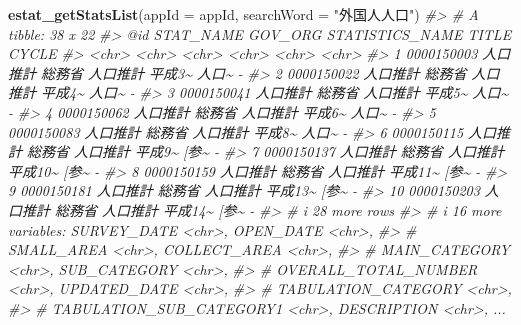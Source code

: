 \documentclass[
  xelatex, ja=standard]{bxjsbook}
\newenvironment{Shaded}{\begin{snugshade}}{\end{snugshade}}
\newcommand{\AttributeTok}[1]{\textcolor[rgb]{0.13,0.29,0.53}{#1}}
\newcommand{\CommentTok}[1]{\textcolor[rgb]{0.56,0.35,0.01}{\textit{#1}}}
\newcommand{\FunctionTok}[1]{\textcolor[rgb]{0.13,0.29,0.53}{\textbf{#1}}}
\newcommand{\NormalTok}[1]{#1}
\newcommand{\StringTok}[1]{\textcolor[rgb]{0.31,0.60,0.02}{#1}}
\theoremstyle{definition}
\theoremstyle{definition}
\theoremstyle{definition}
\theoremstyle{definition}
\theoremstyle{remark}
\begin{document}
\begin{Shaded}
\begin{Highlighting}[]
\FunctionTok{estat\_getStatsList}\NormalTok{(}\AttributeTok{appId =}\NormalTok{ appId, }\AttributeTok{searchWord =} \StringTok{"外国人人口"}\NormalTok{)}
\CommentTok{\#\textgreater{} \# A tibble: 38 x 22}
\CommentTok{\#\textgreater{}    \textasciigrave{}@id\textasciigrave{}      STAT\_NAME GOV\_ORG STATISTICS\_NAME  TITLE CYCLE}
\CommentTok{\#\textgreater{}    \textless{}chr\textgreater{}      \textless{}chr\textgreater{}     \textless{}chr\textgreater{}   \textless{}chr\textgreater{}            \textless{}chr\textgreater{} \textless{}chr\textgreater{}}
\CommentTok{\#\textgreater{}  1 0000150003 人口推計  総務省  人口推計 平成3\textasciitilde{}  人口\textasciitilde{} {-}    }
\CommentTok{\#\textgreater{}  2 0000150022 人口推計  総務省  人口推計 平成4\textasciitilde{}  人口\textasciitilde{} {-}    }
\CommentTok{\#\textgreater{}  3 0000150041 人口推計  総務省  人口推計 平成5\textasciitilde{}  人口\textasciitilde{} {-}    }
\CommentTok{\#\textgreater{}  4 0000150062 人口推計  総務省  人口推計 平成6\textasciitilde{}  人口\textasciitilde{} {-}    }
\CommentTok{\#\textgreater{}  5 0000150083 人口推計  総務省  人口推計 平成8\textasciitilde{}  人口\textasciitilde{} {-}    }
\CommentTok{\#\textgreater{}  6 0000150115 人口推計  総務省  人口推計 平成9\textasciitilde{}  [参\textasciitilde{}  {-}    }
\CommentTok{\#\textgreater{}  7 0000150137 人口推計  総務省  人口推計 平成10\textasciitilde{} [参\textasciitilde{}  {-}    }
\CommentTok{\#\textgreater{}  8 0000150159 人口推計  総務省  人口推計 平成11\textasciitilde{} [参\textasciitilde{}  {-}    }
\CommentTok{\#\textgreater{}  9 0000150181 人口推計  総務省  人口推計 平成13\textasciitilde{} [参\textasciitilde{}  {-}    }
\CommentTok{\#\textgreater{} 10 0000150203 人口推計  総務省  人口推計 平成14\textasciitilde{} [参\textasciitilde{}  {-}    }
\CommentTok{\#\textgreater{} \# i 28 more rows}
\CommentTok{\#\textgreater{} \# i 16 more variables: SURVEY\_DATE \textless{}chr\textgreater{}, OPEN\_DATE \textless{}chr\textgreater{},}
\CommentTok{\#\textgreater{} \#   SMALL\_AREA \textless{}chr\textgreater{}, COLLECT\_AREA \textless{}chr\textgreater{},}
\CommentTok{\#\textgreater{} \#   MAIN\_CATEGORY \textless{}chr\textgreater{}, SUB\_CATEGORY \textless{}chr\textgreater{},}
\CommentTok{\#\textgreater{} \#   OVERALL\_TOTAL\_NUMBER \textless{}chr\textgreater{}, UPDATED\_DATE \textless{}chr\textgreater{},}
\CommentTok{\#\textgreater{} \#   TABULATION\_CATEGORY \textless{}chr\textgreater{},}
\CommentTok{\#\textgreater{} \#   TABULATION\_SUB\_CATEGORY1 \textless{}chr\textgreater{}, DESCRIPTION \textless{}chr\textgreater{}, ...}
\end{Highlighting}
\end{Shaded}
\end{document}
